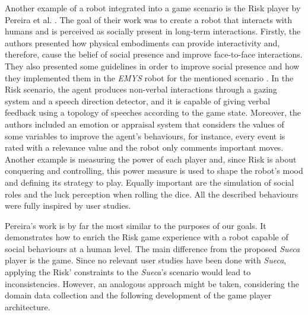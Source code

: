 Another example of a robot integrated into a game scenario is the Risk player by Pereira et al. \cite{Lisboa}.
The goal of their work was to create a robot that interacts with humans and is perceived as socially present in long-term interactions.
Firstly, the authors presented how physical embodiments can provide interactivity and, therefore, cause the belief of social presence and improve face-to-face interactions.
They also presented some guidelines in order to improve social presence and how they implemented them in the \emph{EMYS} robot for the mentioned scenario \cite{Pereira}.
In the Risk scenario, the agent produces non-verbal interactions through a gazing system and a speech direction detector, and it is capable of giving verbal feedback using a topology of speeches according to the game state.
Moreover, the authors included an emotion or appraisal system that considers the values of some variables to improve the agent's behaviours, for instance, every event is rated with a relevance value and the robot only comments important moves.
Another example is measuring the power of each player and, since Risk is about conquering and controlling, this power measure is used to shape the robot's mood and defining its strategy to play.
Equally important are the simulation of social roles and the luck perception when rolling the dice.
All the described behaviours were fully inspired by user studies.

Pereira's work is by far the most similar to the purposes of our goals.
It demonstrates how to enrich the Risk game experience with a robot capable of social behaviours at a human level.
The main difference from the proposed \emph{Sueca} player is the game.
Since no relevant user studies have been done with \emph{Sueca}, applying the Risk' constraints to the \emph{Sueca}'s scenario would lead to inconsistencies.
However, an analogous approach might be taken, considering the domain data collection and the following development of the game player architecture. 


